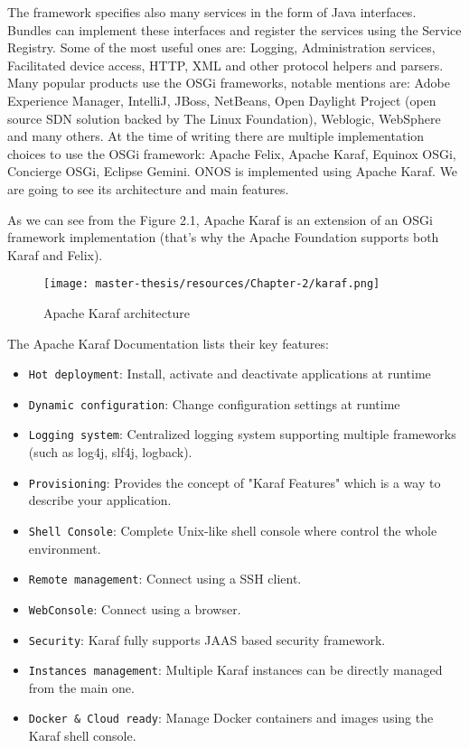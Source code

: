 \documentclass[a4paper,10pt]{memoir}
\begin{document}
The framework specifies also many services in the form of Java interfaces. Bundles can implement these interfaces and register the services using the Service Registry. Some of the most useful ones are: Logging, Administration services, Facilitated device access, HTTP, XML and other protocol helpers and parsers. Many popular products use the OSGi frameworks, notable mentions are: Adobe Experience Manager, IntelliJ, JBoss, NetBeans, Open Daylight Project (open source SDN solution backed by The Linux Foundation), Weblogic, WebSphere and many others. At the time of writing there are multiple implementation choices to use the OSGi framework: Apache Felix, Apache Karaf, Equinox OSGi, Concierge OSGi, Eclipse Gemini. ONOS is implemented using Apache Karaf. We are going to see its architecture and main features.
\medskip

As we can see from the Figure 2.1, Apache Karaf is an extension of an OSGi framework implementation (that's why the Apache Foundation supports both Karaf and Felix). 
\begin{figure}[h]
\caption{Apache Karaf architecture}
\label{fig:karaf}
\texttt{[image: master-thesis/resources/Chapter-2/karaf.png]}
\centering
\end{figure}
The Apache Karaf Documentation lists their key features:
\begin{itemize}
    \item\texttt{Hot deployment}: Install, activate and deactivate applications at runtime
    \item\texttt{Dynamic configuration}: Change configuration settings at runtime
    \item\texttt{Logging system}: Centralized logging system supporting multiple frameworks (such as log4j, slf4j, logback).
    \item\texttt{Provisioning}: Provides the concept of "Karaf Features" which is a way to describe your application.
    \item\texttt{Shell Console}: Complete Unix-like shell console where control the whole environment.
    \item\texttt{Remote management}: Connect using a SSH client.
    \item\texttt{WebConsole}: Connect using a browser.
    \item\texttt{Security}: Karaf fully supports JAAS based security framework.
    \item\texttt{Instances management}: Multiple Karaf instances can be directly managed from the main one.
    \item\texttt{Docker \& Cloud ready}: Manage Docker containers and images using the Karaf shell console.
\end{itemize} 
\end{document}
